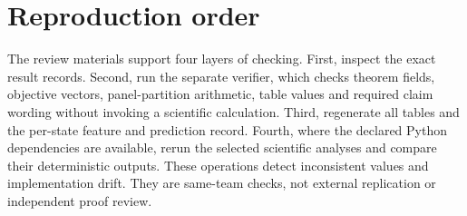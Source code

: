 \documentclass[a4paper,onecolumn,11pt,unpublished,noarxiv]{quantumarticle}
\begin{document}
\AdverseResultsTable
\FloatBarrier

\section{Reproduction order}

The review materials support four layers of checking.  First, inspect the exact result records.  Second, run the separate verifier, which checks theorem fields, objective vectors, panel-partition arithmetic, table values and required claim wording without invoking a scientific calculation.  Third, regenerate all tables and the per-state feature and prediction record.  Fourth, where the declared Python dependencies are available, rerun the selected scientific analyses and compare their deterministic outputs.  These operations detect inconsistent values and implementation drift.  They are same-team checks, not external replication or independent proof review.



\end{document}

